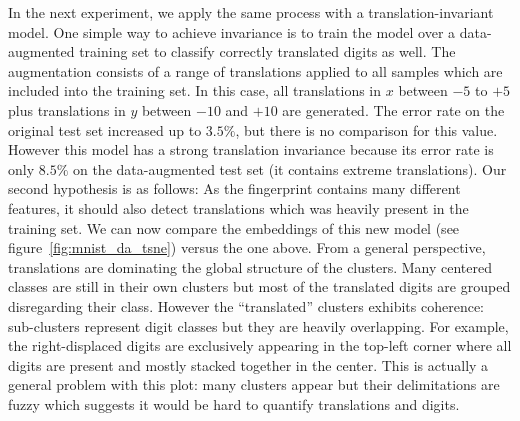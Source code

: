 \documentclass[a4paper,12pt]{report}
\begin{document}
In the next experiment, we apply the same process with a translation-invariant model.
One simple way to achieve invariance is to train the model over a data-augmented training set to classify correctly translated digits as well.
The augmentation consists of a range of translations applied to all samples which are included into the training set.
In this case, all translations in $x$ between $-5$ to $+5$ plus translations in $y$ between $-10$ and $+10$ are generated.
The error rate on the original test set increased up to $3.5\%$, but there is no comparison for this value.
However this model has a strong translation invariance because its error rate is only $8.5\%$ on the data-augmented test set (it contains extreme translations).
Our second hypothesis is as follows: As the fingerprint contains many different features, it should also detect translations which was heavily present in the training set.
We can now compare the embeddings of this new model (see figure~\ref{fig:mnist_da_tsne}) versus the one above.
From a general perspective, translations are dominating the global structure of the clusters.
Many centered classes are still in their own clusters but most of the translated digits are grouped disregarding their class.
However the ``translated'' clusters exhibits coherence: sub-clusters represent digit classes but they are heavily overlapping.
For example, the right-displaced digits are exclusively appearing in the top-left corner where all digits are present and mostly stacked together in the center.
This is actually a general problem with this plot: many clusters appear but their delimitations are fuzzy which suggests it would be hard to quantify translations and digits.
\end{document}
